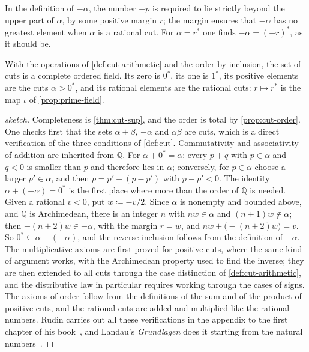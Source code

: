 In the definition of $-\alpha$, the number $-p$ is required to lie strictly beyond the upper part of $\alpha$, by some positive margin $r$; the margin ensures that $-\alpha$ has no greatest element when $\alpha$ is a rational cut. For $\alpha=r^*$ one finds $-\alpha=(-r)^*$, as it should be.

\begin{theorem}[Dedekind]
\label{thm:cuts-field}
With the operations of \cref{def:cut-arithmetic} and the order by inclusion, the set of cuts is a complete ordered field. Its zero is $0^*$, its one is $1^*$, its positive elements are the cuts $\alpha>0^*$, and its rational elements are the rational cuts: $r\mapsto r^*$ is the map $\iota$ of \cref{prop:prime-field}.
\end{theorem}

\begin{proof}[sketch]
Completeness is \cref{thm:cut-sup}, and the order is total by \cref{prop:cut-order}. One checks first that the sets $\alpha+\beta$, $-\alpha$ and $\alpha\beta$ are cuts, which is a direct verification of the three conditions of \cref{def:cut}. Commutativity and associativity of addition are inherited from $\mathbb Q$. For $\alpha+0^*=\alpha$: every $p+q$ with $p\in\alpha$ and $q<0$ is smaller than $p$ and therefore lies in $\alpha$; conversely, for $p\in\alpha$ choose a larger $p'\in\alpha$, and then $p=p'+(p-p')$ with $p-p'<0$. The identity $\alpha+(-\alpha)=0^*$ is the first place where more than the order of $\mathbb Q$ is needed. Given a rational $v<0$, put $w\coloneqq-v/2$. Since $\alpha$ is nonempty and bounded above, and $\mathbb Q$ is Archimedean, there is an integer $n$ with $nw\in\alpha$ and $(n+1)w\notin\alpha$; then $-(n+2)w\in-\alpha$, with the margin $r=w$, and $nw+\bigl(-(n+2)w\bigr)=v$. So $0^*\subseteq\alpha+(-\alpha)$, and the reverse inclusion follows from the definition of $-\alpha$. The multiplicative axioms are first proved for positive cuts, where the same kind of argument works, with the Archimedean property used to find the inverse; they are then extended to all cuts through the case distinction of \cref{def:cut-arithmetic}, and the distributive law in particular requires working through the cases of signs. The axioms of order follow from the definitions of the sum and of the product of positive cuts, and the rational cuts are added and multiplied like the rational numbers. Rudin carries out all these verifications in the appendix to the first chapter of his book~\cite{rudin1976}, and Landau's \emph{Grundlagen} does it starting from the natural numbers~\cite{landau1930}.
\end{proof}

